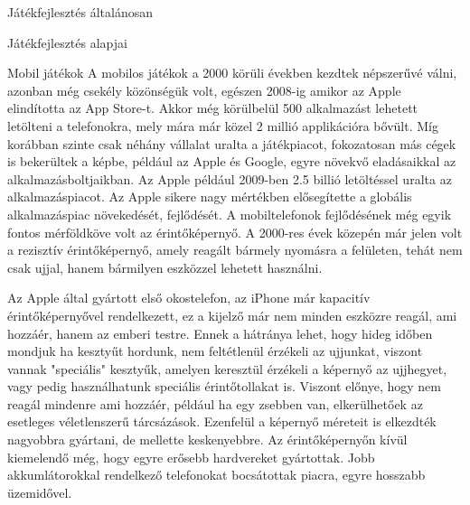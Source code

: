 \begin{MyChapter}{Játékfejlesztés általánosan}
\begin{MySection}{Játékfejlesztés alapjai}
		
		\begin{MySubSection}{Mobil játékok}
		A mobilos játékok a 2000 körüli években kezdtek népszerűvé válni, azonban még csekély közönségük volt, egészen 2008-ig amikor az Apple elindította az App Store-t. Akkor még körülbelül 500 alkalmazást lehetett letölteni a telefonokra, mely mára már közel 2 millió applikációra bővült. Míg korábban szinte csak néhány vállalat uralta a játékpiacot, fokozatosan más cégek is bekerültek a képbe, például az Apple és Google, egyre növekvő eladásaikkal az alkalmazásboltjaikban. Az Apple például 2009-ben 2.5 billió letöltéssel uralta az alkalmazáspiacot. Az Apple sikere nagy mértékben elősegítette a globális alkalmazáspiac növekedését, fejlődését.
		A mobiltelefonok fejlődésének még egyik fontos mérföldköve volt az érintőképernyő. A 2000-res évek közepén már jelen volt a rezisztív érintőképernyő, amely reagált bármely nyomásra a felületen, tehát nem csak ujjal, hanem bármilyen eszközzel lehetett használni.
		
		Az Apple által gyártott első okostelefon, az iPhone már kapacitív érintőképernyővel rendelkezett, ez a kijelző már nem minden eszközre reagál, ami hozzáér, hanem az emberi testre. Ennek a hátránya lehet, hogy hideg időben mondjuk ha kesztyűt hordunk, nem feltétlenül érzékeli az ujjunkat, viszont vannak "speciális" kesztyűk, amelyen keresztül érzékeli a képernyő az ujjhegyet, vagy pedig használhatunk speciális érintőtollakat is. 
		Viszont előnye, hogy nem reagál mindenre ami hozzáér, például ha egy zsebben van, elkerülhetőek az esetleges véletlenszerű tárcsázások.
		Ezenfelül a képernyő méreteit is elkezdték nagyobbra gyártani, de mellette keskenyebbre. Az érintőképernyőn kívül kiemelendő még, hogy egyre erősebb hardvereket gyártottak. Jobb akkumlátorokkal rendelkező telefonokat bocsátottak piacra, egyre hosszabb üzemidővel.
		

\end{MySubSection}
\end{MySection}
\end{MyChapter}

